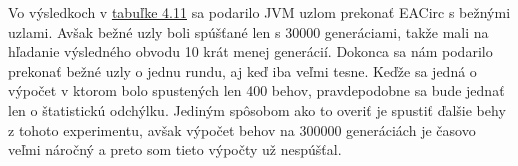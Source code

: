 Vo výsledkoch v \hyperref[tab:exp3-decim-300k]{tabuľke 4.11} sa podarilo JVM uzlom prekonať EACirc s bežnými uzlami. Avšak bežné uzly boli spúšťané len s 30000 generáciami, takže mali na hľadanie výsledného obvodu 10 krát menej generácií. Dokonca sa nám podarilo prekonať bežné uzly o jednu rundu, aj keď iba veľmi tesne. Keďže sa jedná o výpočet v ktorom bolo spustených len 400 behov, pravdepodobne sa bude jednať len o štatistickú odchýlku. Jediným spôsobom ako to overiť je spustiť ďalšie behy z tohoto experimentu, avšak výpočet behov na 300000 generáciách je časovo veľmi náročný a preto som tieto výpočty už nespúšťal.





















